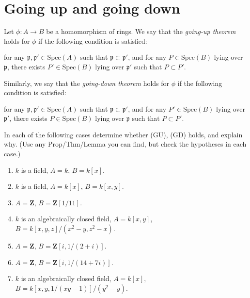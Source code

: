 \section{Going up and going down}
\label{section-going-up}


\begin{definition}
Let $\phi: A \to B$ be a homomorphism of rings. We say
that the {\it going-up theorem} holds for $\phi$ if the
following condition is satisfied:
\begin{list}{(GU)}{}
\item for any ${\mathfrak p}, {\mathfrak p}' \in \text{Spec}(A)$ such that
${\mathfrak p} \subset {\mathfrak p}'$, and for any $P \in \text{Spec}(B)$ lying
over ${\mathfrak p}$, there exists $P'\in \text{Spec}(B)$ lying
over ${\mathfrak p}'$ such that $P \subset P'$.
\end{list}
Similarly, we say that the {\it going-down theorem} holds for $\phi$
if the following condition is satisfied:
\begin{list}{(GD)}{}
\item for any ${\mathfrak p}, {\mathfrak p}' \in \text{Spec}(A)$ such that
${\mathfrak p} \subset {\mathfrak p}'$, and for any
$P' \in \text{Spec}(B)$ lying
over ${\mathfrak p}'$, there exists $P\in \text{Spec}(B)$ lying
over ${\mathfrak p}$ such that $P \subset P'$.
\end{list}
\end{definition}

\begin{exercise}
In each of the following cases determine whether
(GU), (GD) holds, and explain why. (Use any Prop/Thm/Lemma you can find, 
but check the hypotheses in each case.)
\begin{enumerate}
\item $k$ is a field, $A=k$, $B=k[x]$.
\item $k$ is a field, $A=k[x]$, $B=k[x,y]$.
\item $A={\mathbf Z}$, $B={\mathbf Z}[1/11]$.
\item $k$ is an algebraically closed field, $A=k[x,y]$, $B=k[x,y,z]/(x^2-y,z^2-x)$.
\item $A={\mathbf Z}$, $B={\mathbf Z}[i,1/(2+i)]$.
\item $A={\mathbf Z}$, $B={\mathbf Z}[i,1/(14+7i)]$.
\item $k$ is an algebraically closed field, $A=k[x]$, $B=k[x,y,1/(xy-1)]/(y^2-y)$.
\end{enumerate}
\end{exercise}

